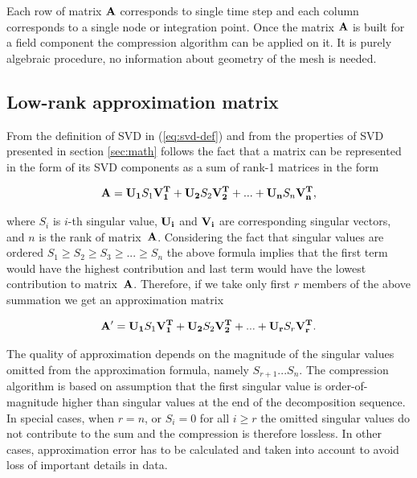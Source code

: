 Each row of matrix $\mathbf{A}$ corresponds to single time step and each column corresponds to a single node or integration point. Once the matrix $\mathbf{A}$ is built for a field component the compression algorithm can be applied on it. It is purely algebraic procedure, no information about geometry of the mesh is needed. 


\subsection{Low-rank approximation matrix}

From the definition of SVD in (\ref{eq:svd-def}) and from the properties of SVD presented in section \ref{sec:math} follows the fact that a matrix can be represented in the form of its SVD components as a sum of rank-1 matrices in the form

\begin{equation}
\mathbf{A}=\mathbf{U_{1}}S_{1}\mathbf{V_{1}^{T}}+\mathbf{U_{2}}S_{2}\mathbf{V_{2}^{T}}+ ... +\mathbf{U_{n}}S_{n}\mathbf{V_{n}^{T}},
\label{eq:svd-expansion}
\end{equation}

\noindent
where $S_{i}$ is $i$-th singular value, $\mathbf{U_{i}}$ and $\mathbf{V_{i}}$ are corresponding singular vectors, and $n$ is the rank of matrix~$\mathbf{A}$. Considering the fact that singular values are ordered $S_{1} \geq S_{2} \geq S_{3} \geq ... \geq S_{n}$ the above formula implies that the first term would have the highest contribution and last term would have the lowest contribution to matrix~$\mathbf{A}$. Therefore, if we take only first $r$ members of the above summation we get an approximation matrix

\begin{equation}
\mathbf{A'}=\mathbf{U_{1}}S_{1}\mathbf{V_{1}^{T}}+\mathbf{U_{2}}S_{2}\mathbf{V_{2}^{T}}+ ... +\mathbf{U_{r}}S_{r}\mathbf{V_{r}^{T}}.
\label{eq:svd-approx-expansion}
\end{equation}

The quality of approximation depends on the magnitude of the singular values omitted from the approximation formula, namely $S_{r+1} ...  S_{n}$. The compression algorithm is based on assumption that the first singular value is order-of-magnitude higher than singular values at the end of the decomposition sequence. In special cases, when $r=n$, or $S_{i}=0$ for all $i \geq r$ the omitted singular values do not contribute to the sum and the compression is therefore lossless. In other cases, approximation error has to be calculated and taken into account to avoid loss of important details in data.

